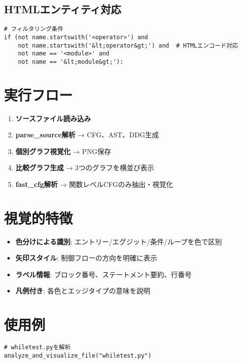\documentclass[a4paper,12pt]{article}
\begin{document}
\subsection{HTMLエンティティ対応}

\begin{lstlisting}[caption=HTMLエンティティ対応]
# フィルタリング条件
if (not name.startswith('<operator>') and
    not name.startswith('&lt;operator&gt;') and  # HTMLエンコード対応
    not name == '<module>' and
    not name == '&lt;module&gt;'):
\end{lstlisting}

\section{実行フロー}

\begin{enumerate}
    \item \textbf{ソースファイル読み込み}
    \item \textbf{parse\_source解析} → CFG、AST、DDG生成
    \item \textbf{個別グラフ視覚化} → PNG保存
    \item \textbf{比較グラフ生成} → 3つのグラフを横並び表示
    \item \textbf{fast\_cfg解析} → 関数レベルCFGのみ抽出・視覚化
\end{enumerate}

\section{視覚的特徴}

\begin{itemize}
    \item \textbf{色分けによる識別}: エントリー/エグジット/条件/ループを色で区別
    \item \textbf{矢印スタイル}: 制御フローの方向を明確に表示
    \item \textbf{ラベル情報}: ブロック番号、ステートメント要約、行番号
    \item \textbf{凡例付き}: 各色とエッジタイプの意味を説明
\end{itemize}

\section{使用例}

\begin{lstlisting}[caption=基本的な使用例]
# whiletest.pyを解析
analyze_and_visualize_file("whiletest.py")
\end{lstlisting}
\end{document}
